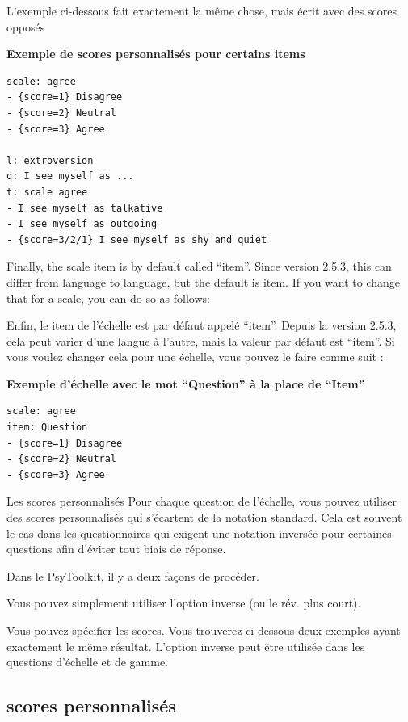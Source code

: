 \documentclass[
]{book}
\begin{document}
L'exemple ci-dessous fait exactement la même chose, mais écrit avec des scores opposés

\textbf{Exemple de scores personnalisés pour certains items}

\begin{verbatim}
scale: agree
- {score=1} Disagree
- {score=2} Neutral
- {score=3} Agree

l: extroversion
q: I see myself as ...
t: scale agree
- I see myself as talkative
- I see myself as outgoing
- {score=3/2/1} I see myself as shy and quiet
\end{verbatim}

Finally, the scale item is by default called ``item''. Since version 2.5.3, this can differ from language to language, but the default is item. If you want to change that for a scale, you can do so as follows:

Enfin, le item de l'échelle est par défaut appelé ``item''. Depuis la version 2.5.3, cela peut varier d'une langue à l'autre, mais la valeur par défaut est ``item''. Si vous voulez changer cela pour une échelle, vous pouvez le faire comme suit :

\textbf{Exemple d'échelle avec le mot ``Question'' à la place de ``Item''}

\begin{verbatim}
scale: agree
item: Question
- {score=1} Disagree
- {score=2} Neutral
- {score=3} Agree
\end{verbatim}

Les scores personnalisés
Pour chaque question de l'échelle, vous pouvez utiliser des scores personnalisés qui s'écartent de la notation standard. Cela est souvent le cas dans les questionnaires qui exigent une notation inversée pour certaines questions afin d'éviter tout biais de réponse.

Dans le PsyToolkit, il y a deux façons de procéder.

Vous pouvez simplement utiliser l'option inverse (ou le rév. plus court).

Vous pouvez spécifier les scores. Vous trouverez ci-dessous deux exemples ayant exactement le même résultat. L'option inverse peut être utilisée dans les questions d'échelle et de gamme.

\hypertarget{scores-personnalisuxe9s}{%
\subsection{scores personnalisés}\label{scores-personnalisuxe9s}}
\end{document}
